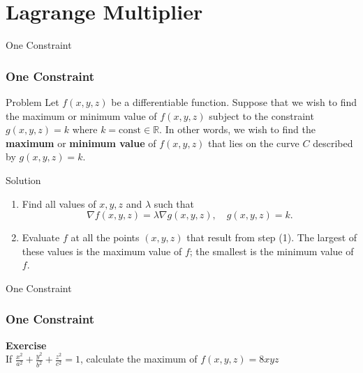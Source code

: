 \documentclass[aspectratio=169, UTF8]{beamer}
\begin{document}
\section{Lagrange Multiplier}
\begin{frame}{One Constraint}
    \frametitle{One Constraint}
    \begin{block}{Problem}
        Let $f(x, y, z)$ be a differentiable function. Suppose that we wish to find the maximum or minimum value of $f(x, y, z)$ subject to the constraint $g(x, y, z) = k$ where $k = \text{const} \in \mathbb{R}$. In other words, we wish to find the \textbf{maximum} or \textbf{minimum value} of $f(x, y, z)$ that lies on the curve $C$ described by $g(x, y, z) = k$.
    \end{block}
    \begin{block}{Solution}
        \begin{enumerate}
            \item Find all values of $x, y, z$ and $\lambda$ such that
        \[
        \boxed{\nabla f(x, y, z) = \lambda \nabla g(x, y, z), \quad g(x, y, z) = k.}
        \]
            \item Evaluate $f$ at all the points $(x, y, z)$ that result from step (1). The largest of these values is the maximum value of $f$; the smallest is the minimum value of $f$.
        \end{enumerate}
        
    \end{block}
\end{frame}
\begin{frame}{One Constraint}
    \frametitle{One Constraint}
    \textbf{Exercise} \\
    If \(\frac{x^2}{a^2} + \frac{y^2}{b^2} + \frac{z^2}{c^2} = 1\), calculate the maximum of \(f(x, y, z) = 8xyz\)
\end{frame}
\end{document}
